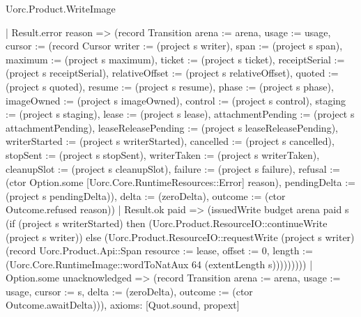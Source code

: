 \begin{lexlean}{Uorc.Product.WriteImage}
\begin{semanticmodule}
{        | Result.error reason => (record Transition {arena := arena, usage := usage, cursor := (record Cursor {writer := (project s writer), span := (project s span), maximum := (project s maximum), ticket := (project s ticket), receiptSerial := (project s receiptSerial), relativeOffset := (project s relativeOffset), quoted := (project s quoted), resume := (project s resume), phase := (project s phase), imageOwned := (project s imageOwned), control := (project s control), staging := (project s staging), lease := (project s lease), attachmentPending := (project s attachmentPending), leaseReleasePending := (project s leaseReleasePending), writerStarted := (project s writerStarted), cancelled := (project s cancelled), stopSent := (project s stopSent), writerTaken := (project s writerTaken), cleanupSlot := (project s cleanupSlot), failure := (project s failure), refusal := (ctor Option.some [Uorc.Core.RuntimeResources::Error] reason), pendingDelta := (project s pendingDelta)}), delta := (zeroDelta), outcome := (ctor Outcome.refused reason)})
        | Result.ok paid => (issuedWrite budget arena paid s (if (project s writerStarted) then (Uorc.Product.ResourceIO::continueWrite (project s writer)) else (Uorc.Product.ResourceIO::requestWrite (project s writer) (record Uorc.Product.Api::Span {resource := lease, offset := 0, length := (Uorc.Core.RuntimeImage::wordToNatAux 64 (extentLength s))})))))))
    | Option.some unacknowledged => (record Transition {arena := arena, usage := usage, cursor := s, delta := (zeroDelta), outcome := (ctor Outcome.awaitDelta)})),
  axioms: [Quot.sound, propext]
}


\end{semanticmodule}
\end{lexlean}
